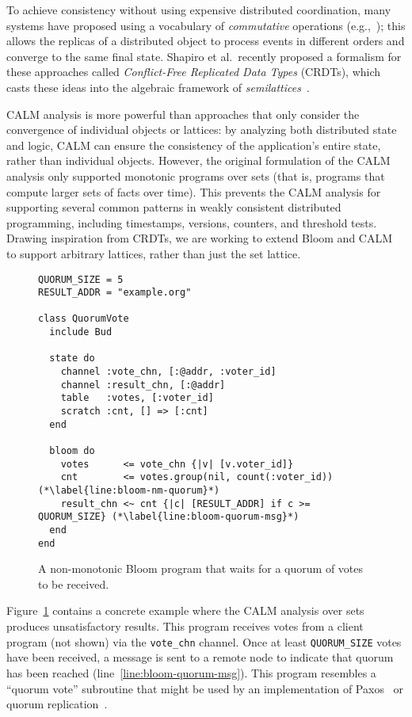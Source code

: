 To achieve consistency without using expensive distributed coordination, many
systems have proposed using a vocabulary of \emph{commutative} operations
(e.g.,~\cite{dynamo,Reiher1994,bayou}); this allows the replicas of a distributed
object to process events in different orders and converge to the same final
state. Shapiro et al.\ recently proposed a formalism for these approaches called
\emph{Conflict-Free Replicated Data Types} (CRDTs), which casts these ideas into
the algebraic framework of \emph{semilattices}~\cite{Shapiro2011a,Shapiro2011b}.

CALM analysis is more powerful than approaches that only consider the
convergence of individual objects or lattices: by analyzing both distributed
state and logic, CALM can ensure the consistency of the application's entire
state, rather than individual objects. However, the original formulation of the
CALM analysis only supported monotonic programs over sets (that is, programs
that compute larger sets of facts over time). This prevents the CALM analysis
for supporting several common patterns in weakly consistent distributed
programming, including timestamps, versions, counters, and threshold
tests. Drawing inspiration from CRDTs, we are working to extend Bloom and CALM
to support arbitrary lattices, rather than just the set lattice.

\begin{figure}[t]
\begin{scriptsize}
\begin{lstlisting}
QUORUM_SIZE = 5
RESULT_ADDR = "example.org"

class QuorumVote
  include Bud

  state do
    channel :vote_chn, [:@addr, :voter_id]
    channel :result_chn, [:@addr]
    table   :votes, [:voter_id]
    scratch :cnt, [] => [:cnt]
  end

  bloom do
    votes      <= vote_chn {|v| [v.voter_id]}
    cnt        <= votes.group(nil, count(:voter_id)) (*\label{line:bloom-nm-quorum}*)
    result_chn <~ cnt {|c| [RESULT_ADDR] if c >= QUORUM_SIZE} (*\label{line:bloom-quorum-msg}*)
  end
end
\end{lstlisting}
\end{scriptsize}
\caption{A non-monotonic Bloom program that waits for a quorum of votes to be received.}
\label{fig:bloom-quorum-set}
\end{figure}

Figure~\ref{fig:bloom-quorum-set} contains a concrete example where the CALM analysis
over sets produces unsatisfactory results. This program receives votes from a
client program (not shown) via the \texttt{vote\_chn} channel. Once at least
\texttt{QUORUM\_SIZE} votes have been received, a message is sent to a remote
node to indicate that quorum has been reached
(line~\ref{line:bloom-quorum-msg}). This program resembles a ``quorum vote''
subroutine that might be used by an implementation of Paxos~\cite{part-time}
or quorum replication~\cite{Gifford1979}.

